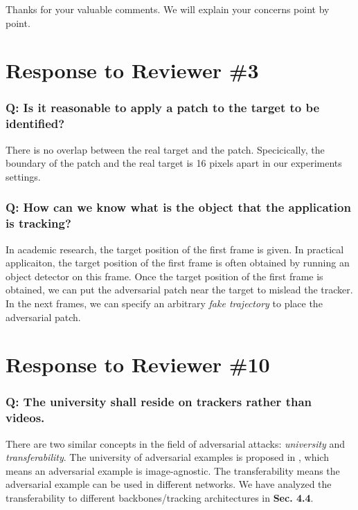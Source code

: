 \documentclass{article}
\begin{document}
Thanks for your valuable comments. We will explain your concerns point by point.

\section{Response to Reviewer \#3}

\subsubsection{Q: Is it reasonable to apply a patch to the target to be identified?}

There is no overlap between the real target and the patch. Specicically, the boundary of the patch and the real target is 16 pixels apart in our experiments settings.

\subsubsection{Q: How can we know what is the object that the application is tracking?}

In academic research, the target position of the first frame is given. In practical applicaiton, the target position of the first frame is often obtained by running an object detector on this frame. Once the target position of the first frame is obtained, we can put the adversarial patch near the target to mislead the tracker. In the next frames, we can specify an arbitrary \textit{fake trajectory} to place the adversarial patch.

\section{Response to Reviewer \#10}
\subsubsection{Q: The university shall reside on trackers rather than videos.}

There are two similar concepts in the field of adversarial attacks: \textit{university} and \textit{transferability}.
The university of adversarial examples is proposed in \cite{UAP}, which means an adversarial example is image-agnostic.
The transferability means the adversarial example can be used in different networks. We have analyzed the transferability to different backbones/tracking architectures in \textbf{Sec. 4.4}.
\end{document}
